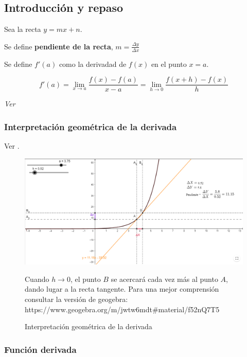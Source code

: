\subsection{Introducción y repaso}
\begin{defn}
Sea la recta $y=mx+n$.

Se define \textbf{pendiente de la recta}, $m=\frac{\Delta y}{\Delta x}$
\end{defn}

\begin{defn}
Se define $f'(a)$ como la derivadad de $f(x)$ en el punto $x=a$.

\[f'(a) = \lim_{x\to a}\frac{f(x)-f(a)}{x-a} = \lim_{h\to 0}\frac{f(x+h)-f(x)}{h}\]

\textit{Ver }
\end{defn}

\subsubsection{Interpretación geométrica de la derivada}

Ver .

\begin{figure}[hbp]
\centering
\includegraphics[scale=0.5]{img/DerivadaInterGeometrica}
\label{img::funinterpretacionderivadapunto}
\caption{Interpretación geométrica de la derivada} Cuando $h\to0$, el punto $B$ se acercará cada vez más al punto $A$, dando lugar a la recta tangente. 
%
Para una mejor comprensión consultar la versión de geogebra: https://www.geogebra.org/m/jwtw6mdt#material/f52nQ7T5

\end{figure} 

\subsubsection{Función derivada}

